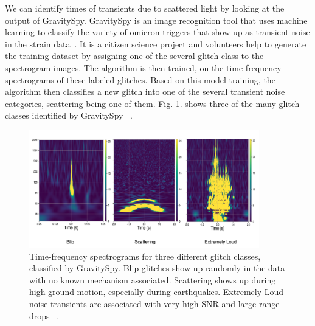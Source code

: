 \documentclass[12pt]{iopart}
\begin{document}


We can identify times of transients due to scattered light by looking at the output of GravitySpy.
GravitySpy is an image recognition tool that uses machine learning to classify the variety of omicron triggers that show up as transient noise in the strain data~\cite{omicron_florent,jess_thesis}. It is a citizen science project and volunteers help to generate the training dataset by assigning one of the several glitch class to the spectrogram images. The algorithm is then trained, on the time-frequency spectrograms of these labeled glitches. Based on this model training, the algorithm then classifies a new glitch into one of the several transient noise categories, scattering being one of them. Fig. \ref{fig:gspyimages}. shows three of the many glitch classes identified by GravitySpy ~\cite{gspy,gspymachine}.

\begin{figure}[h]
    \centering
    \includegraphics[width=10cm]{gspyglitch1.png}
    \caption{Time-frequency spectrograms for three different glitch classes, classified by GravitySpy. Blip glitches show up randomly in the data with no known mechanism associated. Scattering shows up during high ground motion, especially during earthquakes. Extremely Loud noise transients are associated with very high SNR and large range drops ~\cite{gspymachine}. }
    \label{fig:gspyimages}
\end{figure}
\end{document}
